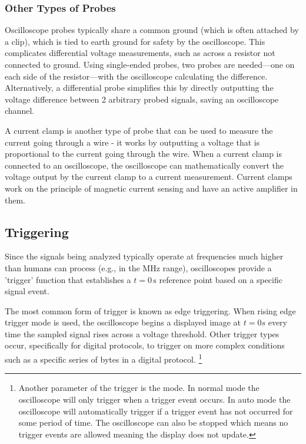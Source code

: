 \documentclass[main.tex]{subfiles}
\begin{document}
\subsubsection{Other Types of Probes}
Oscilloscope probes typically share a common ground (which is often attached by a clip), which is tied to earth ground for safety by the oscilloscope. This complicates differential voltage measurements, such as across a resistor not connected to ground. Using single-ended probes, two probes are needed—one on each side of the resistor—with the oscilloscope calculating the difference. Alternatively, a differential probe simplifies this by directly outputting the voltage difference between 2 arbitrary probed signals, saving an oscilloscope channel. \newline 

\newnoindentpara A current clamp is another type of probe that can be used to measure the current going through a wire - it works by outputting a voltage that is proportional to the current going through the wire. When a current clamp is connected to an oscilloscope, the oscilloscope can mathematically convert the voltage output by the current clamp to a current measurement. Current clamps work on the principle of magnetic current sensing and have an active amplifier in them.


\subsection{Triggering}
Since the signals being analyzed typically operate at frequencies much higher than humans can process (e.g., in the MHz range), oscilloscopes provide a 'trigger' function that establishes a \( t = 0 \, \text{s} \) reference point based on a specific signal event. \newline

\newnoindentpara The most common form of trigger is known as edge triggering. When rising edge trigger mode is used, the oscilloscope begins a displayed image at $t=0s$ every time the sampled signal rises across a voltage threshold. Other trigger types occur, specifically for digital protocols, to trigger on more complex conditions such as a specific series of bytes in a digital protocol. \footnote{Another parameter of the trigger is the mode. In normal mode the oscilloscope will only trigger when a trigger event occurs. In auto mode the oscilloscope will automatically trigger if a trigger event has not occurred for some period of time. The oscilloscope can also be stopped which means no trigger events are allowed meaning the display does not update.}
\end{document}
